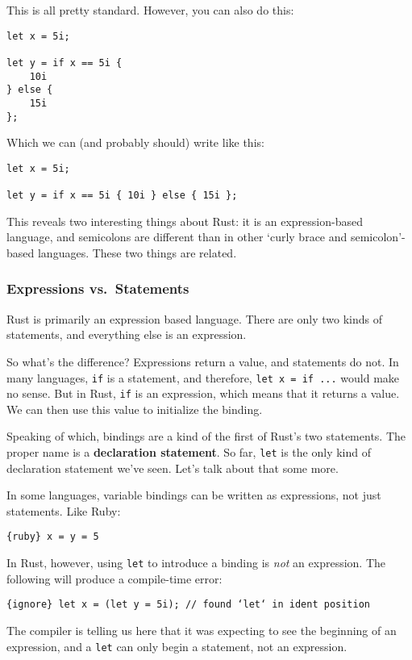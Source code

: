\documentclass[]{article}
\begin{document}
This is all pretty standard. However, you can also do this:

\begin{verbatim}
let x = 5i;

let y = if x == 5i {
    10i
} else {
    15i
};
\end{verbatim}

Which we can (and probably should) write like this:

\begin{verbatim}
let x = 5i;

let y = if x == 5i { 10i } else { 15i };
\end{verbatim}

This reveals two interesting things about Rust: it is an
expression-based language, and semicolons are different than in other
`curly brace and semicolon'-based languages. These two things are
related.

\subsubsection{Expressions
vs.~Statements}\label{expressions-vs.statements}

Rust is primarily an expression based language. There are only two kinds
of statements, and everything else is an expression.

So what's the difference? Expressions return a value, and statements do
not. In many languages, \texttt{if} is a statement, and therefore,
\texttt{let x = if ...} would make no sense. But in Rust, \texttt{if} is
an expression, which means that it returns a value. We can then use this
value to initialize the binding.

Speaking of which, bindings are a kind of the first of Rust's two
statements. The proper name is a \textbf{declaration statement}. So far,
\texttt{let} is the only kind of declaration statement we've seen. Let's
talk about that some more.

In some languages, variable bindings can be written as expressions, not
just statements. Like Ruby:

\texttt{\{ruby\} x = y = 5}

In Rust, however, using \texttt{let} to introduce a binding is
\emph{not} an expression. The following will produce a compile-time
error:

\texttt{\{ignore\} let x = (let y = 5i); // found `let` in ident position}

The compiler is telling us here that it was expecting to see the
beginning of an expression, and a \texttt{let} can only begin a
statement, not an expression.
\end{document}
